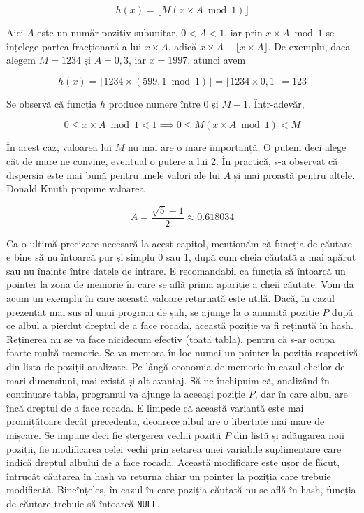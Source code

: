 \begin{equation}
  h(x) = \lfloor M(x \times A \bmod 1) \rfloor
\end{equation}

Aici $A$ este un număr pozitiv subunitar, $0 < A < 1$, iar prin $x \times A
\bmod 1$ se înțelege partea fracționară a lui $x \times A$, adică $x \times A
- \lfloor x \times A \rfloor$. De exemplu, dacă alegem $M = 1234$ și $A =
0,3$, iar $x = 1997$, atunci avem

\begin{equation}
  h(x) = \lfloor 1234 \times (599,1 \bmod 1) \rfloor = \lfloor 1234 \times 0,1 \rfloor = 123
\end{equation}

Se observă că funcția $h$ produce numere între 0 și $M-1$. Într-adevăr, 

\begin{equation}
  0 \leq x \times A \bmod 1 < 1 \implies 0 \leq M(x \times A \bmod 1) < M
\end{equation}

În acest caz, valoarea lui $M$ nu mai are o mare importanță. O putem deci
alege cât de mare ne convine, eventual o putere a lui 2. În practică, s-a
observat că dispersia este mai bună pentru unele valori ale lui $A$ și mai
proastă pentru altele. Donald Knuth propune valoarea

\begin{equation}
  A = \frac{\sqrt{5} - 1}{2} \approx 0.618034
\end{equation}

Ca o ultimă precizare necesară la acest capitol, menționăm că funcția de
căutare e bine să nu întoarcă pur și simplu 0 sau 1, după cum cheia căutată a
mai apărut sau nu înainte între datele de intrare. E recomandabil ca funcția
să întoarcă un pointer la zona de memorie în care se află prima apariție a
cheii căutate. Vom da acum un exemplu în care această valoare returnată este
utilă. Dacă, în cazul prezentat mai sus al unui program de șah, se ajunge la o
anumită poziție $P$ după ce albul a pierdut dreptul de a face rocada, această
poziție va fi reținută în hash. Reținerea nu se va face nicidecum efectiv
(toată tabla), pentru că s-ar ocupa foarte multă memorie. Se va memora în loc
numai un pointer la poziția respectivă din lista de poziții analizate. Pe
lângă economia de memorie în cazul cheilor de mari dimensiuni, mai există și
alt avantaj. Să ne închipuim că, analizând în continuare tabla, programul va
ajunge la aceeași poziție $P$, dar în care albul are încă dreptul de a face
rocada. E limpede că această variantă este mai promițătoare decât precedenta,
deoarece albul are o libertate mai mare de mișcare. Se impune deci fie
ștergerea vechii poziții $P$ din listă și adăugarea noii poziții, fie
modificarea celei vechi prin setarea unei variabile suplimentare care indică
dreptul albului de a face rocada. Această modificare este ușor de făcut,
întrucât căutarea în hash va returna chiar un pointer la poziția care trebuie
modificată. Bineînțeles, în cazul în care poziția căutată nu se află în hash,
funcția de căutare trebuie să întoarcă {\tt NULL}.

